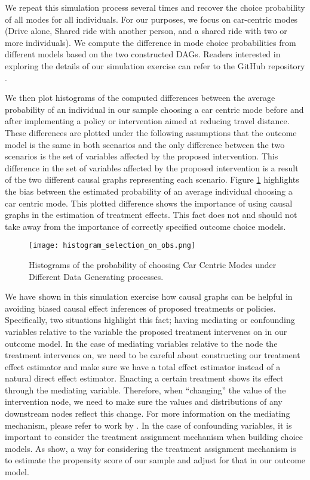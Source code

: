 We repeat this simulation process several times and recover the choice probability of all modes for all individuals.
For our purposes, we focus on car-centric modes (Drive alone, Shared ride with another person,
and a shared ride with two or more individuals).
We compute the difference in mode choice probabilities from different models based on the two constructed DAGs.
Readers interested in exploring the details of our simulation exercise can refer to the GitHub repository \citep{brathwaite_etal_2020}.



We then plot histograms of the computed differences between the average probability of an individual
in our sample choosing a car centric mode before and after implementing a policy or intervention
aimed at reducing travel distance.
These differences are plotted under the following assumptions that the outcome model is the same in both scenarios and the only difference between the two scenarios is the set of variables affected by the proposed intervention.
This difference in the set of variables affected by the proposed intervention is a result of the two different causal graphs representing each scenario.
Figure \ref{fig:histogram_probability} highlights the bias between the estimated probability of an average individual choosing a car centric mode.
This plotted difference shows the importance of using causal graphs in the estimation of treatment effects.
This fact does not and should not take away from the importance of correctly specified outcome choice models.

\begin{figure}[h!]
   \centering
   \texttt{[image: histogram\_selection\_on\_obs.png]}
   \caption{Histograms of the probability of choosing Car Centric Modes under Different Data Generating processes.}
   \label{fig:histogram_probability}
\end{figure}

We have shown in this simulation exercise how causal graphs can be helpful in avoiding biased causal effect inferences of proposed treatments or policies.
Specifically, two situations highlight this fact; having mediating or confounding variables relative to the variable the proposed treatment intervenes on in our outcome model.
In the case of mediating variables relative to the node the treatment intervenes on, we need to be careful about constructing our treatment effect estimator and make sure we have a total effect estimator instead of a natural direct effect estimator.
Enacting a certain treatment shows its effect through the mediating variable.
Therefore, when ``changing'' the value of the intervention node, we need to make sure the values and distributions of any downstream nodes reflect this change.
For more information on the mediating mechanism, please refer to work by \citet{pearl_2012}.
In the case of confounding variables, it is important to consider the treatment assignment mechanism when building choice models.
As \citep{hahn2020} show, a way for considering the treatment assignment mechanism is to estimate the propensity score of our sample and adjust for that in our outcome model.

